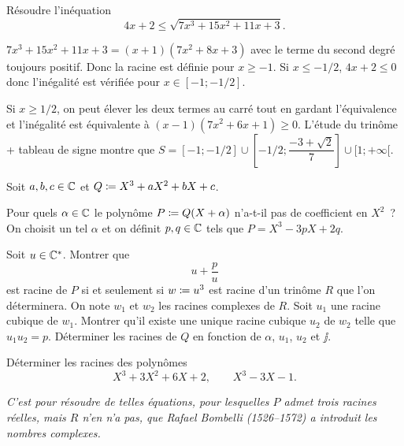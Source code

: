 \documentclass{magnolia}
\begin{document}
Résoudre l'inéquation
\[4x+2\leq\sqrt{7x^3+15x^2+11x+3}.\]

\begin{sol}
$7x^3+15x^2+11x+3=(x+1)(7x^2+8x+3)$ avec le terme du second degré toujours positif. Donc la racine est définie pour $x\geq -1$.
Si $x\leq -1/2$, $4x+2\leq 0$ donc l'inégalité est vérifiée pour $x\in [-1;-1/2]$.

Si $x\geq 1/2$, on peut élever les deux termes au carré tout en gardant l'équivalence et l'inégalité est équivalente à $(x-1)(7x^2+6x+1)\geq 0$. L'étude du trinôme + tableau de signe montre que $S=[-1;-1/2]\cup[-1/2;\dfrac{-3+\sqrt{2}}{7}]\cup [1;+\infty[.$
\end{sol}


Soit $a,b,c\in\mathbb{C}$ et $Q\coloneqq X^3+aX^2+bX+c$. 
\begin{questions}
\question Pour quels $\alpha\in\mathbb{C}$ le polynôme $P\coloneqq Q(X+\alpha)$ n'a-t-il pas de coefficient en $X^2$~?
\enonce On choisit un tel $\alpha$ et on définit $p,q\in\mathbb{C}$ tels que $P=X^3-3pX+2q$.
\question 
\begin{questions}
\question Soit $u\in\mathbb{C}^*$. Montrer que
  \[u+\frac{p}{u}\]
  est racine de $P$ si et seulement si $w\coloneqq u^3$ est racine d'un trinôme $R$ que l'on déterminera.
\question On note $w_1$ et $w_2$ les racines complexes de $R$. Soit $u_1$ une racine cubique de $w_1$. Montrer qu'il existe une unique racine cubique $u_2$ de $w_2$ telle que $u_1u_2=p$.
\question Déterminer les racines de $Q$ en fonction de $\alpha$, $u_1$, $u_2$ et $\jj$.
\end{questions} 
\question Déterminer les racines des polynômes
  \[X^3+3X^2+6X+2,\qquad X^3-3X-1.\]
\end{questions}

\textit{C'est pour résoudre de telles équations, pour lesquelles $P$ admet trois racines réelles, mais $R$ n'en n'a pas, que {\sc Rafael Bombelli} (1526--1572) a introduit les nombres complexes.}
\end{document}
